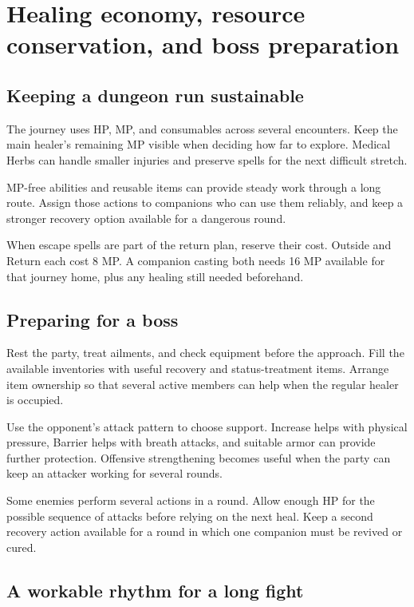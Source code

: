 \section{Healing economy, resource conservation, and boss preparation}

\subsection*{Keeping a dungeon run sustainable}

The journey uses HP, MP, and consumables across several encounters. Keep
the main healer's remaining MP visible when deciding how far to explore.
Medical Herbs can handle smaller injuries and preserve spells for the
next difficult stretch.

MP-free abilities and reusable items can provide steady work through a
long route. Assign those actions to companions who can use them reliably,
and keep a stronger recovery option available for a dangerous round.

When escape spells are part of the return plan, reserve their cost.
Outside and Return each cost 8 MP. A companion casting both needs 16 MP
available for that journey home, plus any healing still needed beforehand.

\subsection*{Preparing for a boss}

Rest the party, treat ailments, and check equipment before the approach.
Fill the available inventories with useful recovery and status-treatment
items. Arrange item ownership so that several active members can help
when the regular healer is occupied.

Use the opponent's attack pattern to choose support. Increase helps with
physical pressure, Barrier helps with breath attacks, and suitable armor
can provide further protection. Offensive strengthening becomes useful
when the party can keep an attacker working for several rounds.

Some enemies perform several actions in a round. Allow enough HP for
the possible sequence of attacks before relying on the next heal. Keep
a second recovery action available for a round in which one companion
must be revived or cured.

\subsection*{A workable rhythm for a long fight}

